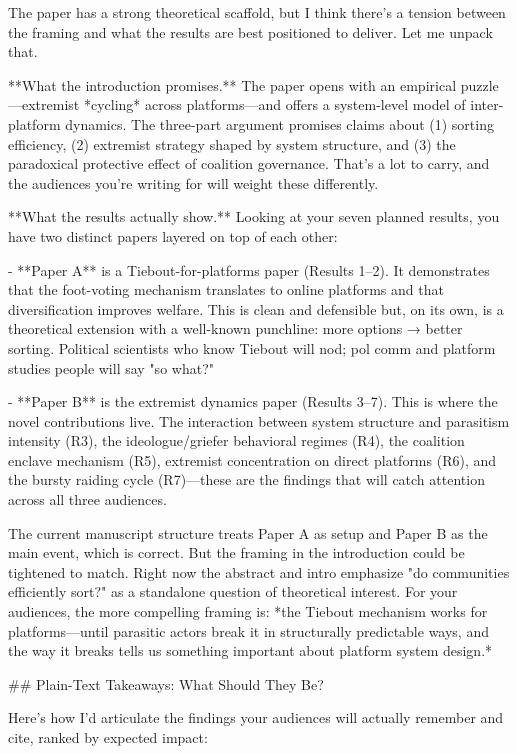 
The paper has a strong theoretical scaffold, but I think there's a tension between the framing and what the results are best positioned to deliver. Let me unpack that.

**What the introduction promises.** The paper opens with an empirical puzzle—extremist *cycling* across platforms—and offers a system-level model of inter-platform dynamics. The three-part argument promises claims about (1) sorting efficiency, (2) extremist strategy shaped by system structure, and (3) the paradoxical protective effect of coalition governance. That's a lot to carry, and the audiences you're writing for will weight these differently.

**What the results actually show.** Looking at your seven planned results, you have two distinct papers layered on top of each other:

- **Paper A** is a Tiebout-for-platforms paper (Results 1–2). It demonstrates that the foot-voting mechanism translates to online platforms and that diversification improves welfare. This is clean and defensible but, on its own, is a theoretical extension with a well-known punchline: more options → better sorting. Political scientists who know Tiebout will nod; pol comm and platform studies people will say "so what?"

- **Paper B** is the extremist dynamics paper (Results 3–7). This is where the novel contributions live. The interaction between system structure and parasitism intensity (R3), the ideologue/griefer behavioral regimes (R4), the coalition enclave mechanism (R5), extremist concentration on direct platforms (R6), and the bursty raiding cycle (R7)—these are the findings that will catch attention across all three audiences.

The current manuscript structure treats Paper A as setup and Paper B as the main event, which is correct. But the framing in the introduction could be tightened to match. Right now the abstract and intro emphasize "do communities efficiently sort?" as a standalone question of theoretical interest. For your audiences, the more compelling framing is: *the Tiebout mechanism works for platforms—until parasitic actors break it in structurally predictable ways, and the way it breaks tells us something important about platform system design.*

## Plain-Text Takeaways: What Should They Be?

Here's how I'd articulate the findings your audiences will actually remember and cite, ranked by expected impact:

